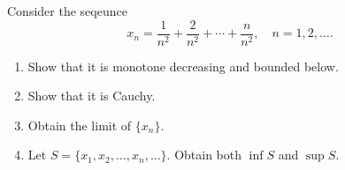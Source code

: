 \begingroup
\renewcommand{\labelenumi}{(\alph{enumi})}
\begin{exercise}
  \label{ex:hw02:decreasing-sequence}
  Consider the seqeunce
  \[
    x_n=\frac{1}{n^2}+\frac{2}{n^2}+\cdots+\frac{n}{n^2},
    \quad n=1,2,\ldots.
  \]
  \begin{enumerate}
    \item Show that it is monotone decreasing and bounded below.
    \item Show that it is Cauchy.
    \item Obtain the limit of $\{x_n\}$.
    \item Let $S=\{x_1,x_2,\ldots,x_n,\ldots\}$.
      Obtain both $\inf S$ and $\sup S$.
  \end{enumerate}
\end{exercise}
\endgroup
